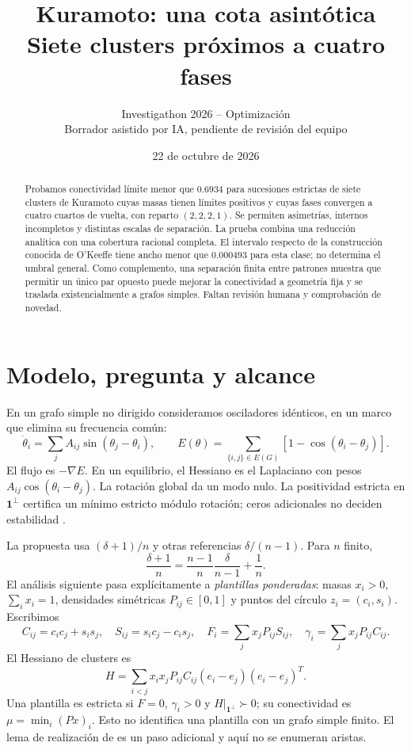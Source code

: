 \documentclass[10pt,a4paper]{article}
\title{\vspace{-1.2cm}Kuramoto: una cota asintótica\\Siete clusters próximos a cuatro fases}
\author{Investigathon 2026 -- Optimización\\
\small Borrador asistido por IA, pendiente de revisión del equipo}
\date{22 de octubre de 2026}
\begin{document}
\maketitle
\vspace{-0.7cm}
\begin{abstract}
Probamos conectividad límite menor que $0.6934$ para sucesiones estrictas de siete clusters de Kuramoto cuyas masas tienen límites positivos y cuyas fases convergen a cuatro cuartos de vuelta, con reparto $(2,2,2,1)$. Se permiten asimetrías, internos incompletos y distintas escalas de separación. La prueba combina una reducción analítica con una cobertura racional completa. El intervalo respecto de la construcción conocida de O'Keeffe tiene ancho menor que $0.000493$ para esta clase; no determina el umbral general. Como complemento, una separación finita entre patrones muestra que permitir un único par opuesto puede mejorar la conectividad a geometría fija y se traslada existencialmente a grafos simples. Faltan revisión humana y comprobación de novedad.
\end{abstract}

\section{Modelo, pregunta y alcance}
En un grafo simple no dirigido consideramos osciladores idénticos, en un marco que elimina su frecuencia común:
\[
 \dot\theta_i=\sum_j A_{ij}\sin(\theta_j-\theta_i),\qquad
 E(\theta)=\sum_{\{i,j\}\in E(G)}[1-\cos(\theta_i-\theta_j)].
\]
El flujo es $-\nabla E$. En un equilibrio, el Hessiano es el Laplaciano con pesos $A_{ij}\cos(\theta_i-\theta_j)$. La rotación global da un modo nulo. La positividad estricta en $\mathbf1^\perp$ certifica un mínimo estricto módulo rotación; ceros adicionales no deciden estabilidad \cite{bullo}.

La propuesta usa $(\delta+1)/n$ y otras referencias $\delta/(n-1)$. Para $n$ finito,
\[
 \frac{\delta+1}{n}=\frac{n-1}{n}\frac{\delta}{n-1}+\frac1n.
\]
El análisis siguiente pasa explícitamente a \emph{plantillas ponderadas}: masas $x_i>0$, $\sum_i x_i=1$, densidades simétricas $P_{ij}\in[0,1]$ y puntos del círculo $z_i=(c_i,s_i)$. Escribimos
\[
 C_{ij}=c_ic_j+s_is_j,\quad S_{ij}=s_ic_j-c_is_j,\quad
 F_i=\sum_jx_jP_{ij}S_{ij},\quad \gamma_i=\sum_jx_jP_{ij}C_{ij}.
\]
El Hessiano de clusters es
\[
 H=\sum_{i<j}x_ix_jP_{ij}C_{ij}(e_i-e_j)(e_i-e_j)^T.
\]
Una plantilla es estricta si $F=0$, $\gamma_i>0$ y $H|_{\mathbf1^\perp}\succ0$; su conectividad es $\mu=\min_i(Px)_i$. Esto no identifica una plantilla con un grafo simple finito. El lema de realización de \cite{okeeffe} es un paso adicional y aquí no se enumeran aristas.
\end{document}
